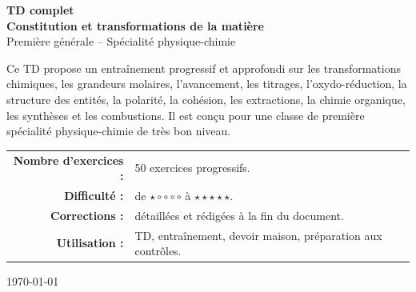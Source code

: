 \documentclass[11pt,a4paper]{article}
\newcounter{exercice}
\begin{document}
\begin{titlepage}
\begin{center}

\vspace*{0.8cm}

{\Huge\bfseries TD complet}\\[0.3cm]
{\Huge\bfseries Constitution et transformations de la matière}\\[0.5cm]
{\Large Première générale -- Spécialité physique-chimie}\\[1cm]


\vfill

\begin{tcolorbox}[colback=bleuclair,colframe=bleu,width=0.92\textwidth,title=\textbf{Objectif général}]
Ce TD propose un entraînement progressif et approfondi sur les transformations chimiques,
les grandeurs molaires, l'avancement, les titrages, l'oxydo-réduction, la structure des entités,
la polarité, la cohésion, les extractions, la chimie organique, les synthèses et les combustions.
Il est conçu pour une classe de première spécialité physique-chimie de très bon niveau.
\end{tcolorbox}

\vfill

\begin{tabular}{rl}
\textbf{Nombre d'exercices :} & 50 exercices progressifs.\\
\textbf{Difficulté :} & de $\star\circ\circ\circ\circ$ à $\star\star\star\star\star$.\\
\textbf{Corrections :} & détaillées et rédigées à la fin du document.\\
\textbf{Utilisation :} & TD, entraînement, devoir maison, préparation aux contrôles.\\
\end{tabular}

\vfill

{\large \today}

\end{center}
\end{titlepage}
\end{document}
